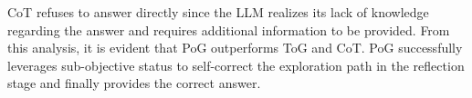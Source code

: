 \documentclass{article}
\begin{document}
CoT refuses to answer directly since the LLM realizes its lack of knowledge regarding the answer and requires additional information to be provided.
From this analysis, it is evident that PoG outperforms ToG and CoT. PoG successfully leverages sub-objective status to self-correct the exploration path in the reflection stage and finally provides the correct answer. 

\vspace{-2mm}
\end{document}
